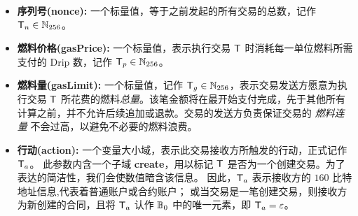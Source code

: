 \begin{itemize} [nosep]
	\item {\bf 序列号(nonce):} 一个标量值，等于之前发起的所有交易的总数，记作 $\textsf{T}_n \in\mathbb{N}_{256}$。

	\item {\bf 燃料价格(gasPrice):} 一个标量值，表示执行交易 $\textsf{T}$ 时消耗每一单位燃料所需支付的 Drip 数，记作 $\textsf{T}_p\in\mathbb{N}_{256}$。

	\item {\bf 燃料量(gasLimit):} 
	一个标量值，记作 $\textsf{T}_g\in\mathbb{N}_{256}$，表示交易发送方愿意为执行交易 $\textsf{T}$ 所花费的燃料\emph{总量}。该笔金额将在最开始支付完成，先于其他所有计算之前，并不允许后续追加或退款。交易的发送方负责保证交易的 \emph{燃料连量} 不会过高，以避免不必要的燃料浪费。

	\item {\bf 行动(action):} 
	一个变量大小域，表示此交易接收方所触发的行动，正式记作 $\textsf{T}_a$。
	此参数内含一个子域 {\bf create}，用以标记 $\textsf{T}$ 是否为一个创建交易。为了表达的简洁性，我们会使数值暗含该信息。
	因此，$\textsf{T}_a$ 表示接收方的 $160$ 比特地址信息,代表着普通账户或合约账户； 
	或当交易是一笔创建交易，则接收方为新创建的合同，且将 $\textsf{T}_a$ 认作 $\mathbb{B}_0$ 中的唯一元素，即 $\textsf{T}_a = \mathbb{\varepsilon}$。


\end{itemize}
